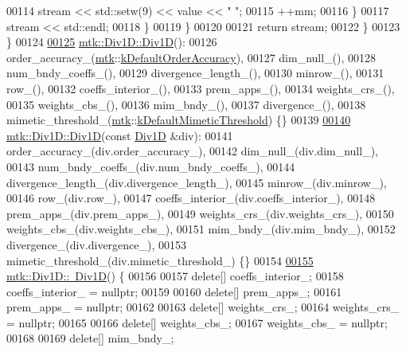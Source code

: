 \begin{DoxyCode}
00114         stream << std::setw(9) << value << \textcolor{stringliteral}{" "};
00115         ++mm;
00116       \}
00117       stream << std::endl;
00118     \}
00119   \}
00120 
00121   \textcolor{keywordflow}{return} stream;
00122 \}
00123 \}
00124 
\hypertarget{mtk__div__1d_8cc_source_l00125}{}\hyperlink{classmtk_1_1Div1D_a339c66dd4ed8f50cbeda3645de18e5ab}{00125} \hyperlink{classmtk_1_1Div1D_a339c66dd4ed8f50cbeda3645de18e5ab}{mtk::Div1D::Div1D}():
00126   order\_accuracy\_(\hyperlink{namespacemtk}{mtk}::\hyperlink{group__c01-roots_ga0d95560098eb36420511103637b6952f}{kDefaultOrderAccuracy}),
00127   dim\_null\_(),
00128   num\_bndy\_coeffs\_(),
00129   divergence\_length\_(),
00130   minrow\_(),
00131   row\_(),
00132   coeffs\_interior\_(),
00133   prem\_apps\_(),
00134   weights\_crs\_(),
00135   weights\_cbs\_(),
00136   mim\_bndy\_(),
00137   divergence\_(),
00138   mimetic\_threshold\_(\hyperlink{namespacemtk}{mtk}::\hyperlink{group__c01-roots_ga35718d949bdc81a08a9cc8ebbe3478a2}{kDefaultMimeticThreshold}) \{\}
00139 
\hypertarget{mtk__div__1d_8cc_source_l00140}{}\hyperlink{classmtk_1_1Div1D_a25376152cf97aa27f6b61bcb62b4ea7a}{00140} \hyperlink{classmtk_1_1Div1D_a339c66dd4ed8f50cbeda3645de18e5ab}{mtk::Div1D::Div1D}(\textcolor{keyword}{const} \hyperlink{classmtk_1_1Div1D}{Div1D} &div):
00141   order\_accuracy\_(div.order\_accuracy\_),
00142   dim\_null\_(div.dim\_null\_),
00143   num\_bndy\_coeffs\_(div.num\_bndy\_coeffs\_),
00144   divergence\_length\_(div.divergence\_length\_),
00145   minrow\_(div.minrow\_),
00146   row\_(div.row\_),
00147   coeffs\_interior\_(div.coeffs\_interior\_),
00148   prem\_apps\_(div.prem\_apps\_),
00149   weights\_crs\_(div.weights\_crs\_),
00150   weights\_cbs\_(div.weights\_cbs\_),
00151   mim\_bndy\_(div.mim\_bndy\_),
00152   divergence\_(div.divergence\_),
00153   mimetic\_threshold\_(div.mimetic\_threshold\_) \{\}
00154 
\hypertarget{mtk__div__1d_8cc_source_l00155}{}\hyperlink{classmtk_1_1Div1D_ac2c215f42b8da513df2a4ee477b5fa1f}{00155} \hyperlink{classmtk_1_1Div1D_ac2c215f42b8da513df2a4ee477b5fa1f}{mtk::Div1D::~Div1D}() \{
00156 
00157   \textcolor{keyword}{delete}[] coeffs\_interior\_;
00158   coeffs\_interior\_ = \textcolor{keyword}{nullptr};
00159 
00160   \textcolor{keyword}{delete}[] prem\_apps\_;
00161   prem\_apps\_ = \textcolor{keyword}{nullptr};
00162 
00163   \textcolor{keyword}{delete}[] weights\_crs\_;
00164   weights\_crs\_ = \textcolor{keyword}{nullptr};
00165 
00166   \textcolor{keyword}{delete}[] weights\_cbs\_;
00167   weights\_cbs\_ = \textcolor{keyword}{nullptr};
00168 
00169   \textcolor{keyword}{delete}[] mim\_bndy\_;

\end{DoxyCode}
